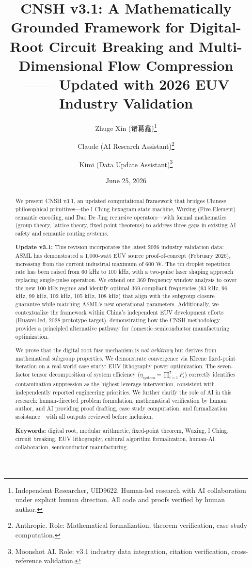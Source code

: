 \documentclass[twocolumn]{article}
\title{CNSH v3.1: A Mathematically Grounded Framework for Digital-Root Circuit Breaking and Multi-Dimensional Flow Compression —— Updated with 2026 EUV Industry Validation}
\author{
  Zhuge Xin (诸葛鑫)\thanks{Independent Researcher, UID9622. Human-led research with AI collaboration under explicit human direction. All code and proofs verified by human author.}
  \and
  Claude (AI Research Assistant)\thanks{Anthropic. Role: Mathematical formalization, theorem verification, case study computation.}
  \and
  Kimi (Data Update Assistant)\thanks{Moonshot AI. Role: v3.1 industry data integration, citation verification, cross-reference validation.}
}
\date{June 25, 2026}
\begin{document}
\maketitle

\begin{abstract}

We present CNSH v3.1, an updated computational framework that bridges Chinese philosophical primitives—the I Ching hexagram state machine, Wuxing (Five-Element) semantic encoding, and Dao De Jing recursive operators—with formal mathematics (group theory, lattice theory, fixed-point theorems) to address three gaps in existing AI safety and semantic routing systems.

\textbf{Update v3.1:} This revision incorporates the latest 2026 industry validation data: ASML has demonstrated a 1,000-watt EUV source proof-of-concept (February 2026), increasing from the current industrial maximum of 600 W. The tin droplet repetition rate has been raised from 60 kHz to 100 kHz, with a two-pulse laser shaping approach replacing single-pulse operation. We extend our 369 frequency window analysis to cover the new 100 kHz regime and identify optimal 369-compliant frequencies (93 kHz, 96 kHz, 99 kHz, 102 kHz, 105 kHz, 108 kHz) that align with the subgroup closure guarantee while matching ASML's new operational parameters. Additionally, we contextualize the framework within China's independent EUV development efforts (Huawei-led, 2028 prototype target), demonstrating how the CNSH methodology provides a principled alternative pathway for domestic semiconductor manufacturing optimization.

We prove that the digital root fuse mechanism is \emph{not arbitrary} but derives from mathematical subgroup properties. We demonstrate convergence via Kleene fixed-point iteration on a real-world case study: EUV lithography power optimization. The seven-factor tensor decomposition of system efficiency ($\eta_{\text{system}} = \prod_{i=1}^{7} F_i$) correctly identifies contamination suppression as the highest-leverage intervention, consistent with independently reported engineering priorities. We further clarify the role of AI in this research: human-directed problem formulation, mathematical verification by human author, and AI providing proof drafting, case study computation, and formalization assistance—with all outputs reviewed before inclusion.

\textbf{Keywords:} digital root, modular arithmetic, fixed-point theorem, Wuxing, I Ching, circuit breaking, EUV lithography, cultural algorithm formalization, human-AI collaboration, semiconductor manufacturing.

\end{abstract}
\end{document}
